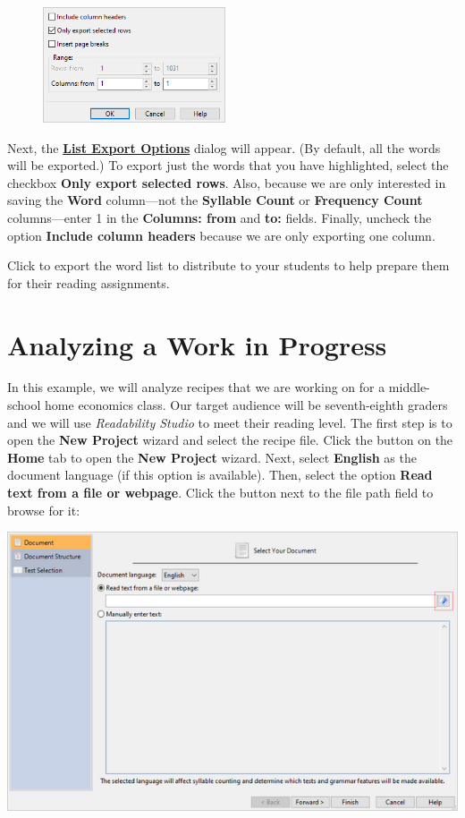 \documentclass[
]{book}
\theoremstyle{definition}
\theoremstyle{definition}
\theoremstyle{definition}
\theoremstyle{definition}
\theoremstyle{remark}
\begin{document}
\begin{figure}
\includegraphics[width=0.48\textwidth,height=\textheight]{Images/exportoptions.png}

\end{figure}

Next, the \protect\hyperlink{export-list}{\textbf{List Export Options}} dialog will appear. (By default, all the words will be exported.) To export just the words that you have highlighted, select the checkbox \textbf{Only export selected rows}. Also, because we are only interested in saving the \textbf{Word} column---not the \textbf{Syllable Count} or \textbf{Frequency Count} columns---enter 1 in the \textbf{Columns: from} and \textbf{to:} fields. Finally, uncheck the option \textbf{Include column headers} because we are only exporting one column.

Click  to export the word list to distribute to your students to help prepare them for their reading assignments.

\hypertarget{analyzing-a-work-in-progress}{%
\section{Analyzing a Work in Progress}\label{analyzing-a-work-in-progress}}

In this example, we will analyze recipes that we are working on for a middle-school home economics class. Our target audience will be seventh-eighth graders and we will use \emph{Readability Studio} to meet their reading level. The first step is to open the \textbf{New Project} wizard and select the recipe file. Click the  button on the \textbf{Home} tab to open the \textbf{New Project} wizard. Next, select \textbf{English} as the document language (if this option is available). Then, select the option \textbf{Read text from a file or webpage}. Click the button next to the file path field to browse for it:

\includegraphics{Images/exampleselectfile.png}
\end{document}
